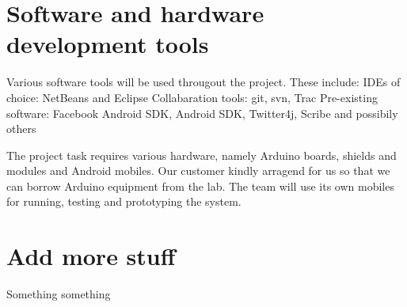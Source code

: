 \section{Software and hardware development tools}

Various software tools will be used througout the project. These include:
IDEs of choice: NetBeans and Eclipse
Collabaration tools: git, svn, Trac
Pre-existing software: Facebook Android SDK,    Android SDK, Twitter4j, Scribe and possibily others

The project task requires various hardware, namely Arduino boards, shields and modules and Android mobiles. Our customer kindly arragend for us so that we can borrow Arduino equipment from the lab. The team will use its own
mobiles for running, testing and prototyping the system.


\section{Add more stuff}

Something something